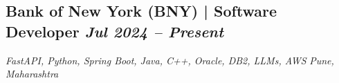 \documentclass[a4paper,10pt]{article}
\newcommand{\subtext}[1]{
#1\par\vspace{-0.2cm}}
\newenvironment{zitemize}{
\begin{itemize}\itemsep0pt \parskip0pt \parsep1pt}
{\end{itemize}\vspace{-0.7cm}}
\begin{document}
\subsection*{Bank of New York (BNY) | Software Developer \hfill {\small\textit{Jul 2024 – Present}}}
\subtext{\textit{FastAPI, Python, Spring Boot, Java, C++, Oracle, DB2, LLMs, AWS} \hfill \textit{Pune, Maharashtra}}
\begin{zitemize}




\end{zitemize}
\end{document}
